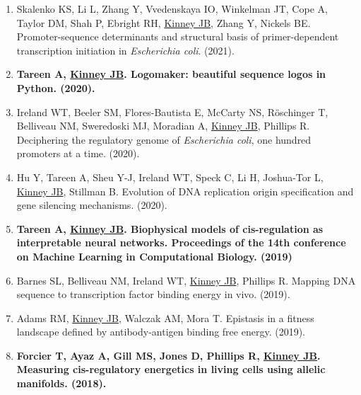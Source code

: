 \documentclass[10pt,hidelinks]{article}
\begin{document}
\begin{enumerate}
\item Skalenko KS, Li L, Zhang Y, Vvedenskaya IO, Winkelman JT, Cope A, Taylor DM, Shah P, Ebright RH, \underline{Kinney JB}, Zhang Y, Nickels BE. Promoter-sequence determinants and structural basis of primer-dependent transcription initiation in \textit{Escherichia coli}.  (2021).

\item \textbf{Tareen A, \underline{Kinney JB}. Logomaker: beautiful sequence logos in Python.  (2020).}

\item Ireland WT, Beeler SM, Flores-Bautista E, McCarty NS, R\"{o}schinger T, Belliveau NM, Sweredoski MJ, Moradian A, \underline{Kinney JB}, Phillips R. Deciphering the regulatory genome of \textit{Escherichia coli}, one hundred promoters at a time.  (2020).
  
\item Hu Y, Tareen A, Sheu Y-J, Ireland WT, Speck C, Li H, Joshua-Tor L, \underline{Kinney JB}, Stillman B. Evolution of DNA replication origin specification and gene silencing mechanisms.  (2020).
  
\item \textbf{Tareen A, \underline{Kinney JB}. Biophysical models of cis-regulation as interpretable neural networks. Proceedings of the 14th conference on Machine Learning in Computational Biology.  (2019)}
  
\item Barnes SL, Belliveau NM, Ireland WT, \underline{Kinney JB}, Phillips R. Mapping DNA sequence to transcription factor binding energy in vivo.  (2019).

\item Adams RM, \underline{Kinney JB}, Walczak AM, Mora T. Epistasis in a fitness landscape defined by antibody-antigen binding free energy.  (2019).

\item \textbf{Forcier T, Ayaz A, Gill MS, Jones D, Phillips R, \underline{Kinney JB}. Measuring cis-regulatory energetics in living cells using allelic manifolds.  (2018).} 


\end{enumerate}
\end{document}
